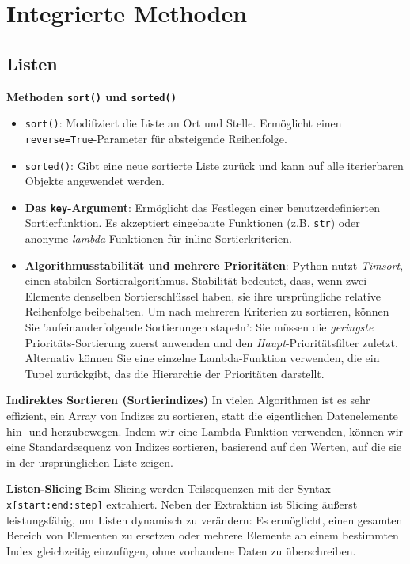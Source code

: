 \section{Integrierte Methoden}
\subsection{Listen}

\textbf{Methoden \texttt{sort()} und \texttt{sorted()}}
\begin{itemize}
    \item \texttt{sort()}: Modifiziert die Liste an Ort und Stelle. Ermöglicht einen \texttt{reverse=True}-Parameter für absteigende Reihenfolge.
    \item \texttt{sorted()}: Gibt eine neue sortierte Liste zurück und kann auf alle iterierbaren Objekte angewendet werden.
    \item \textbf{Das \texttt{key}-Argument}: Ermöglicht das Festlegen einer benutzerdefinierten Sortierfunktion. Es akzeptiert eingebaute Funktionen (z.B. \texttt{str}) oder anonyme \textit{lambda}-Funktionen für inline Sortierkriterien.
    \item \textbf{Algorithmusstabilität und mehrere Prioritäten}: Python nutzt 
    \textit{Timsort}, einen stabilen Sortieralgorithmus. Stabilität bedeutet, dass, wenn zwei 
    Elemente denselben Sortierschlüssel haben, sie ihre ursprüngliche relative Reihenfolge beibehalten. 
    Um nach mehreren Kriterien zu sortieren, können Sie 'aufeinanderfolgende Sortierungen stapeln': Sie müssen 
    die \textit{geringste} Prioritäts-Sortierung zuerst anwenden und den \textit{Haupt}-Prioritätsfilter zuletzt.
    Alternativ können Sie eine einzelne Lambda-Funktion verwenden, die ein Tupel 
    zurückgibt, das die Hierarchie der Prioritäten darstellt.
\end{itemize}



\textbf{Indirektes Sortieren (Sortierindizes)}
In vielen Algorithmen ist es sehr effizient, ein Array von Indizes zu sortieren, statt die eigentlichen Datenelemente hin- und herzubewegen. Indem wir eine Lambda-Funktion verwenden, können wir eine Standardsequenz von Indizes sortieren, basierend auf den Werten, auf die sie in der ursprünglichen Liste zeigen.



\textbf{Listen-Slicing}
Beim Slicing werden Teilsequenzen mit der Syntax \texttt{x[start:end:step]} extrahiert. Neben der Extraktion ist Slicing äußerst leistungsfähig, um Listen dynamisch zu verändern: Es ermöglicht, einen gesamten Bereich von Elementen zu ersetzen oder mehrere Elemente an einem bestimmten Index gleichzeitig einzufügen, ohne vorhandene Daten zu überschreiben.

